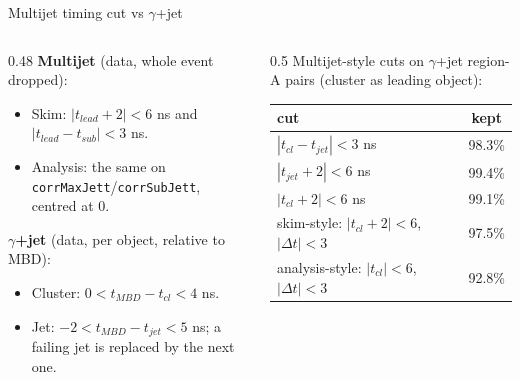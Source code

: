 \documentclass[aspectratio=169,10pt]{beamer}
\begin{document}
\begin{frame}{Multijet timing cut vs $\gamma$+jet}
  \small
  \begin{columns}[T]
    \begin{column}{0.48\textwidth}
      \textbf{Multijet} (data, whole event dropped):
      \begin{itemize}
        \item Skim: $|t_{lead} + 2| < 6$ ns and $|t_{lead} - t_{sub}| < 3$ ns.
        \item Analysis: the same on \texttt{corrMaxJett}/\texttt{corrSubJett}, centred at 0.
      \end{itemize}
      \textbf{$\gamma$+jet} (data, per object, relative to MBD):
      \begin{itemize}
        \item Cluster: $0 < t_{MBD} - t_{cl} < 4$ ns.
        \item Jet: $-2 < t_{MBD} - t_{jet} < 5$ ns; a failing jet is replaced by the next one.
      \end{itemize}
    \end{column}
    \begin{column}{0.5\textwidth}
      Multijet-style cuts on $\gamma$+jet region-A pairs (cluster as leading object):
      \vspace{0.3em}

      \footnotesize
      \begin{tabular}{lc}
        \toprule
        cut & kept \\
        \midrule
        $|t_{cl} - t_{jet}| < 3$ ns & 98.3\% \\
        $|t_{jet} + 2| < 6$ ns & 99.4\% \\
        $|t_{cl} + 2| < 6$ ns & 99.1\% \\
        skim-style: $|t_{cl} + 2| < 6$, $|\Delta t| < 3$ & 97.5\% \\
        analysis-style: $|t_{cl}| < 6$, $|\Delta t| < 3$ & 92.8\% \\
        \bottomrule
      \end{tabular}
    \end{column}
  \end{columns}
\end{frame}
\end{document}
